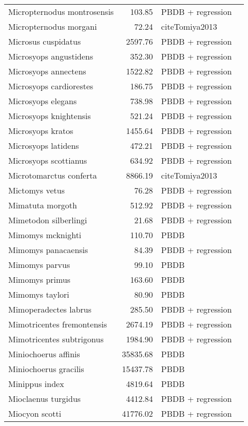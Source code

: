 \begin{table}[ht]
\begin{tabular}{lrll}
  Micropternodus montrosensis & 103.85 & PBDB + regression &  \\ 
  Micropternodus morgani & 72.24 & cite{Tomiya2013} &  \\ 
  Microsus cuspidatus & 2597.76 & PBDB + regression &  \\ 
  Microsyops angustidens & 352.30 & PBDB + regression &  \\ 
  Microsyops annectens & 1522.82 & PBDB + regression &  \\ 
  Microsyops cardiorestes & 186.75 & PBDB + regression &  \\ 
  Microsyops elegans & 738.98 & PBDB + regression &  \\ 
  Microsyops knightensis & 521.24 & PBDB + regression &  \\ 
  Microsyops kratos & 1455.64 & PBDB + regression &  \\ 
  Microsyops latidens & 472.21 & PBDB + regression &  \\ 
  Microsyops scottianus & 634.92 & PBDB + regression &  \\ 
  Microtomarctus conferta & 8866.19 & cite{Tomiya2013} &  \\ 
  Mictomys vetus & 76.28 & PBDB + regression &  \\ 
  Mimatuta morgoth & 512.92 & PBDB + regression &  \\ 
  Mimetodon silberlingi & 21.68 & PBDB + regression &  \\ 
  Mimomys mcknighti & 110.70 & PBDB &  \\ 
  Mimomys panacaensis & 84.39 & PBDB + regression &  \\ 
  Mimomys parvus & 99.10 & PBDB &  \\ 
  Mimomys primus & 163.60 & PBDB &  \\ 
  Mimomys taylori & 80.90 & PBDB &  \\ 
  Mimoperadectes labrus & 285.50 & PBDB + regression &  \\ 
  Mimotricentes fremontensis & 2674.19 & PBDB + regression &  \\ 
  Mimotricentes subtrigonus & 1984.90 & PBDB + regression &  \\ 
  Miniochoerus affinis & 35835.68 & PBDB &  \\ 
  Miniochoerus gracilis & 15437.78 & PBDB &  \\ 
  Minippus index & 4819.64 & PBDB &  \\ 
  Mioclaenus turgidus & 4412.84 & PBDB + regression &  \\ 
  Miocyon scotti & 41776.02 & PBDB + regression &  \\ 

\end{tabular}
\end{table}
